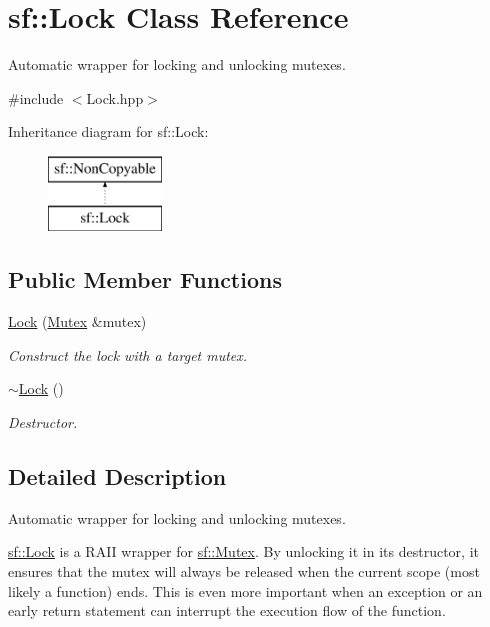 \hypertarget{classsf_1_1Lock}{\section{sf\-:\-:Lock Class Reference}
\label{classsf_1_1Lock}
}


Automatic wrapper for locking and unlocking mutexes.  




{\ttfamily \#include $<$Lock.\-hpp$>$}

Inheritance diagram for sf\-:\-:Lock\-:\begin{figure}[H]
\begin{center}
\leavevmode
\includegraphics[height=2.000000cm]{classsf_1_1Lock}
\end{center}
\end{figure}
\subsection*{Public Member Functions}
\begin{DoxyCompactItemize}
\item 
\hyperlink{classsf_1_1Lock_a1a4c5d7a15da61103d85c9aa7f118920}{Lock} (\hyperlink{classsf_1_1Mutex}{Mutex} \&mutex)
\begin{DoxyCompactList}\small\item\em Construct the lock with a target mutex. \end{DoxyCompactList}\item 
\hyperlink{classsf_1_1Lock_a8168b36323a18ccf5b6bc531d964aec5}{$\sim$\-Lock} ()
\begin{DoxyCompactList}\small\item\em Destructor. \end{DoxyCompactList}\end{DoxyCompactItemize}


\subsection{Detailed Description}
Automatic wrapper for locking and unlocking mutexes. 

\hyperlink{classsf_1_1Lock}{sf\-::\-Lock} is a R\-A\-I\-I wrapper for \hyperlink{classsf_1_1Mutex}{sf\-::\-Mutex}. By unlocking it in its destructor, it ensures that the mutex will always be released when the current scope (most likely a function) ends. This is even more important when an exception or an early return statement can interrupt the execution flow of the function.

